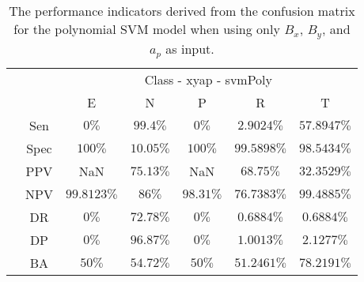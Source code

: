 \begin{table}[!ht]
	\centering
	\begin{tabular}{|c|c|c|c|c|c|c|}
		\cline{3-7}
		\multicolumn{2}{c|}{} & \multicolumn{5}{c|}{Class - xyap - svmPoly} \\ \cline{3-7}
		\multicolumn{2}{c|}{} & E & N & P & R & T \\ \hline
		\multirow{7}{*}{\rotatebox{90}{Statistics}} & Sen & $0\%$ & $99.4\%$ & $0\%$ & $2.9024\%$ & $57.8947\%$ \\ \cline{2-7}
		 & Spec & $100\%$ & $10.05\%$ & $100\%$ & $99.5898\%$ & $98.5434\%$ \\ \cline{2-7}
		 & PPV & NaN & $75.13\%$ & NaN & $68.75\%$ & $32.3529\%$ \\ \cline{2-7}
		 & NPV & $99.8123\%$ & $86\%$ & $98.31\%$ & $76.7383\%$ & $99.4885\%$ \\ \cline{2-7}
		 & DR & $0\%$ & $72.78\%$ & $0\%$ & $0.6884\%$ & $0.6884\%$ \\ \cline{2-7}
		 & DP & $0\%$ & $96.87\%$ & $0\%$ & $1.0013\%$ & $2.1277\%$ \\ \cline{2-7}
		 & BA & $50\%$ & $54.72\%$ & $50\%$ & $51.2461\%$ & $78.2191\%$ \\ \hline
	\end{tabular}
	\caption{The performance indicators derived from the confusion matrix for the polynomial SVM model when using only $B_{x}$, $B_{y}$, and $a_{p}$ as input.}
	\label{tab:cs:reverse:xyap:svmPoly}
\end{table}
